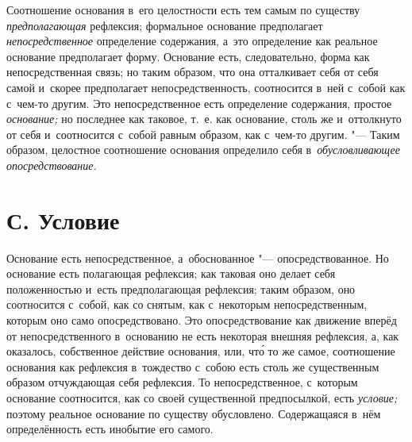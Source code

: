 Соотношение основания в~его целостности есть тем самым по существу
{\em предполагающая} рефлексия; формальное основание
предполагает {\em непосредственное} определение
содержания, а~это определение как реальное основание предполагает форму.
Основание есть, следовательно, форма как непосредственная связь; но таким
образом, что она отталкивает себя от себя самой и~скорее предполагает
непосредственность, соотносится в~ней с~собой как с~чем-то другим. Это
непосредственное есть определение содержания, простое
{\em основание;} но последнее как таковое, т.~е. как
основание, столь же и~оттолкнуто от себя и~соотносится с~собой равным
образом, как с~чем-то другим. "--- Таким образом, целостное соотношение
основания определило себя в~{\em обусловливающее опосредствование.}

\section[С. Условие]{С. Условие}


Основание есть непосредственное, а~обоснованное
"--- опосредствованное. Но основание есть полагающая рефлексия; как таковая
оно делает себя положенностью и~есть предполагающая рефлексия; таким
образом, оно соотносится с~собой, как со снятым, как с~некоторым
непосредственным, которым оно само опосредствовано. Это опосредствование
как движение вперёд от непосредственного в~основанию не есть некоторая
внешняя рефлексия, а, как оказалось, собственное действие основания, или,
чт\'{о} то же самое, соотношение основания как рефлексия в~тождество с~собою
есть столь же существенным образом отчуждающая себя рефлексия. То
непосредственное, с~которым основание соотносится, как со своей
существенной предпосылкой, есть {\em условие;} поэтому
реальное основание по существу обусловлено. Содержащаяся в~нём
определённость есть инобытие его самого.


